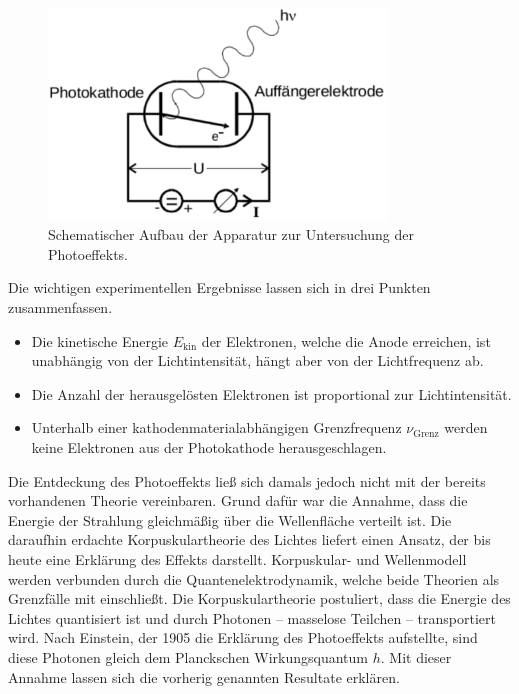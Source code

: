 \begin{figure}
	\centering
	\includegraphics[width=0.8\textwidth]{Bilder/schematischer_Aufbau.pdf}
	\caption{Schematischer Aufbau der Apparatur zur Untersuchung der Photoeffekts. \cite{skript}}
	\label{fig:schematischer Aufbau}
\end{figure}
\newpage
Die wichtigen experimentellen Ergebnisse lassen sich in drei Punkten zusammenfassen.
\begin{itemize}
	\item Die kinetische Energie $E_\mathup{kin}$ der Elektronen, welche die Anode erreichen, ist unabhängig von der Lichtintensität, hängt aber von der Lichtfrequenz ab.
	\item Die Anzahl der herausgelösten Elektronen ist proportional zur Lichtintensität.
	\item Unterhalb einer kathodenmaterialabhängigen Grenzfrequenz $\nu_\mathup{Grenz}$ werden keine Elektronen aus der Photokathode herausgeschlagen.
\end{itemize}

Die Entdeckung des Photoeffekts ließ sich damals jedoch nicht mit der bereits vorhandenen Theorie vereinbaren.
 Grund dafür war die Annahme, dass die Energie der Strahlung gleichmäßig über die Wellenfläche verteilt ist.
Die daraufhin erdachte Korpuskulartheorie des Lichtes liefert einen Ansatz, der bis heute eine Erklärung des Effekts darstellt. Korpuskular- und Wellenmodell werden verbunden durch die Quantenelektrodynamik, welche beide Theorien als Grenzfälle mit einschließt. 
Die Korpuskulartheorie postuliert, dass die Energie des Lichtes quantisiert ist und durch Photonen --  masselose Teilchen -- transportiert wird. 
Nach Einstein, der 1905 die Erklärung des Photoeffekts aufstellte, sind diese Photonen gleich dem Planckschen Wirkungsquantum $h$. 
Mit dieser Annahme lassen sich die vorherig genannten Resultate erklären.

